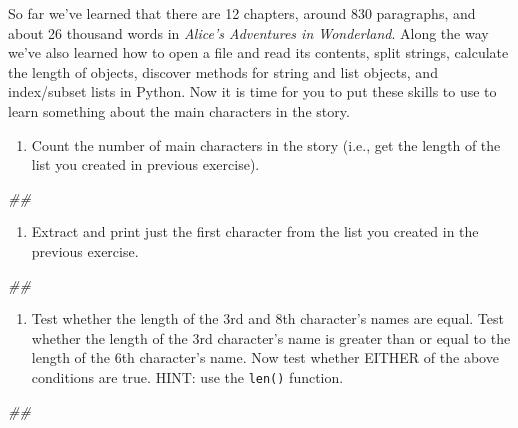 \documentclass[]{book}
\newenvironment{Shaded}{\begin{snugshade}}{\end{snugshade}}
\newcommand{\CommentTok}[1]{\textcolor[rgb]{0.56,0.35,0.01}{\textit{#1}}}
\providecommand{\tightlist}{%
  \setlength{\itemsep}{0pt}\setlength{\parskip}{0pt}}
\begin{document}
So far we've learned that there are 12 chapters, around 830 paragraphs, and about 26 thousand words in \emph{Alice's Adventures in Wonderland}. Along the way we've also learned how to open a file and read its contents, split strings, calculate the length of objects, discover methods for string and list objects, and index/subset lists in Python. Now it is time for you to put these skills to use to learn something about the main characters in the story.

\begin{enumerate}
\def\labelenumi{\arabic{enumi}.}
\tightlist
\item
  Count the number of main characters in the story (i.e., get the length of the list you created in previous exercise).
\end{enumerate}

\begin{Shaded}
\begin{Highlighting}[]
\CommentTok{##}
\end{Highlighting}
\end{Shaded}

\begin{enumerate}
\def\labelenumi{\arabic{enumi}.}
\setcounter{enumi}{1}
\tightlist
\item
  Extract and print just the first character from the list you created in the previous exercise.
\end{enumerate}

\begin{Shaded}
\begin{Highlighting}[]
\CommentTok{##}
\end{Highlighting}
\end{Shaded}

\begin{enumerate}
\def\labelenumi{\arabic{enumi}.}
\setcounter{enumi}{2}
\tightlist
\item
  Test whether the length of the 3rd and 8th character's names are equal. Test whether the length of
  the 3rd character's name is greater than or equal to the length of the 6th character's name. Now test
  whether EITHER of the above conditions are true. HINT: use the \texttt{len()} function.
\end{enumerate}

\begin{Shaded}
\begin{Highlighting}[]
\CommentTok{##}
\end{Highlighting}
\end{Shaded}
\end{document}
